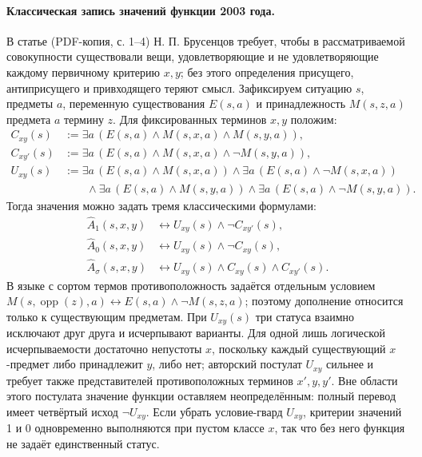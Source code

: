 \documentclass[12pt,a4paper]{article}
\begin{document}
\paragraph{Классическая запись значений функции 2003 года.} В статье (PDF-копия, с. 1–4) Н. П. Брусенцов требует, чтобы в рассматриваемой совокупности существовали вещи, удовлетворяющие и не удовлетворяющие каждому первичному критерию \(x,y\); без этого определения присущего, антиприсущего и привходящего теряют смысл. Зафиксируем ситуацию \(s\), предметы \(a\), переменную существования \(E(s,a)\) и принадлежность \(M(s,z,a)\) предмета \(a\) термину \(z\). Для фиксированных терминов \(x,y\) положим:
\[
\begin{aligned}
C_{xy}(s) &:= \exists a\,(E(s,a)\land M(s,x,a)\land M(s,y,a)),\\
C_{xy'}(s) &:= \exists a\,(E(s,a)\land M(s,x,a)\land\neg M(s,y,a)),\\
U_{xy}(s) &:= \exists a\,(E(s,a)\land M(s,x,a))\land
\exists a\,(E(s,a)\land\neg M(s,x,a))\\
&\qquad\land\exists a\,(E(s,a)\land M(s,y,a))\land
\exists a\,(E(s,a)\land\neg M(s,y,a)).
\end{aligned}
\]
Тогда значения можно задать тремя классическими формулами:
\[
\begin{aligned}
\widehat A_1(s,x,y)&\leftrightarrow U_{xy}(s)\land\neg C_{xy'}(s),\\
\widehat A_0(s,x,y)&\leftrightarrow U_{xy}(s)\land\neg C_{xy}(s),\\
\widehat A_\sigma(s,x,y)&\leftrightarrow U_{xy}(s)\land C_{xy}(s)\land C_{xy'}(s).
\end{aligned}
\]
В языке с сортом термов противоположность задаётся отдельным условием \(M(s,\operatorname{opp}(z),a)\leftrightarrow E(s,a)\land\neg M(s,z,a)\); поэтому дополнение относится только к существующим предметам. При \(U_{xy}(s)\) три статуса взаимно исключают друг друга и исчерпывают варианты. Для одной лишь логической исчерпываемости достаточно непустоты \(x\), поскольку каждый существующий \(x\)-предмет либо принадлежит \(y\), либо нет; авторский постулат \(U_{xy}\) сильнее и требует также представителей противоположных терминов \(x',y,y'\). Вне области этого постулата значение функции оставляем неопределённым: полный перевод имеет четвёртый исход \(\neg U_{xy}\). Если убрать условие-гвард \(U_{xy}\), критерии значений 1 и 0 одновременно выполняются при пустом классе \(x\), так что без него функция не задаёт единственный статус.
\end{document}
